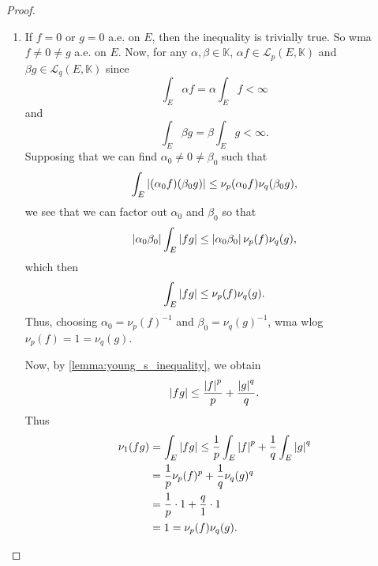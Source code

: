 \documentclass[notoc,notitlepage]{tufte-book}
\begin{document}
\begin{proof}
  \begin{enumerate}
    \item If $f = 0$ or $g = 0$ a.e. on $E$, then the inequality is trivially
      true. So wma $f \neq 0 \neq g$ a.e. on $E$. Now, for any $\alpha, \beta
      \in \mathbb{K}$, $\alpha f \in \mathcal{L}_p(E, \mathbb{K})$ and $\beta g
      \in \mathcal{L}_q(E, \mathbb{K})$ since
      \begin{equation*}
        \int_{E} \alpha f = \alpha \int_{E} f < \infty
      \end{equation*}
      and
      \begin{equation*}
        \int_{E} \beta g = \beta \int_{E} g < \infty.
      \end{equation*}
      Supposing that we can find $\alpha_0 \neq 0 \neq \beta_0$ such that
      \begin{equation*}
        \int_{E} \left|(\alpha_0 f)(\beta_0 g)\right| \leq \nu_p(\alpha_0 f)
        \nu_q(\beta_0 g),
      \end{equation*}
      we see that we can factor out $\alpha_0$ and $\beta_0$ so that
      \begin{equation*}
        \left|\alpha_0 \beta_0\right| \int_{E} \left|fg\right| \leq \left|\alpha_0 \beta_0\right|
        \nu_p(f) \nu_q(g),
      \end{equation*}
      which then
      \begin{equation*}
        \int_{E} \left|fg\right| \leq \nu_p(f) \nu_q(g).
      \end{equation*}
      Thus, choosing $\alpha_0 = \nu_p(f)^{-1}$ and $\beta_0 = \nu_q(g)^{-1}$,
      wma wlog $\nu_p(f) = 1 = \nu_q(g)$.

      Now, by \cref{lemma:young_s_inequality}, we obtain
      \begin{equation*}
        \left|fg\right| \leq \frac{\left|f\right|^p}{p} + \frac{\left|g\right|^q}{q}.
      \end{equation*}
      Thus
      \begin{align*}
        \nu_1(fg) &= \int_{E} \left|fg\right|
                   \leq \frac{1}{p} \int_{E} \left|f\right|^p + \frac{1}{q} \int_{E}
                   \left|g\right|^q \\
                  &= \frac{1}{p} \nu_p(f)^p + \frac{1}{q} \nu_q(g)^q \\
                  &= \frac{1}{p} \cdot 1 + \frac{q}{1} \cdot 1 \\
                  &= 1 = \nu_p(f) \nu_q(g).
      \end{align*}


\end{enumerate}
\end{proof}
\end{document}
